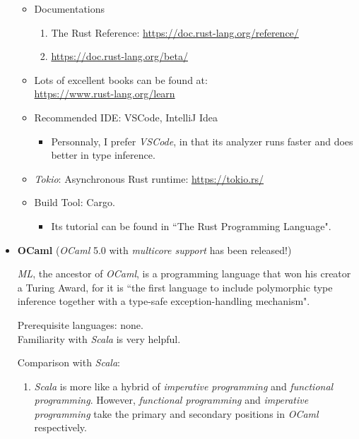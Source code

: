 \documentclass{article}
\begin{document}
\begin{itemize}
\begin{itemize}
\begin{enumerate}
        \end{enumerate}
        \item Documentations
        \begin{enumerate}
            \item The Rust Reference:
            \href{https://doc.rust-lang.org/reference/}{https://doc.rust-lang.org/reference/}
            \item \href{https://doc.rust-lang.org/beta/}{https://doc.rust-lang.org/beta/}
        \end{enumerate}
        \item Lots of excellent books can be found at:\\
        \href{https://www.rust-lang.org/learn}{https://www.rust-lang.org/learn}
        \item Recommended IDE: VSCode, IntelliJ Idea
        \begin{itemize}
            \item Personnaly, I prefer \emph{VSCode}, in that its analyzer runs faster and does better in type inference.
        \end{itemize}
        \item \emph{Tokio}: Asynchronous Rust runtime:
        \href{https://tokio.rs/}{https://tokio.rs/}
        \item Build Tool: Cargo.
        \begin{itemize}
            \item Its tutorial can be found in ``The Rust Programming Language".
        \end{itemize}
    \end{itemize}

    \item \textbf{OCaml} (\emph{OCaml} 5.0 with \emph{multicore support} has been released!)
    
    \emph{ML}, the ancestor of \emph{OCaml}, is a programming language that won his creator a Turing Award, for it is ``the first language to include polymorphic type inference together with a type-safe exception-handling mechanism".
    
    Prerequisite languages: none.\\
    Familiarity with \emph{Scala} is very helpful.
    
    Comparison with \emph{Scala}:
    \begin{enumerate}
        \item \emph{Scala} is more like a hybrid of \emph{imperative programming} and \emph{functional programming}.
        However, \emph{functional programming} and \emph{imperative programming} take the primary and secondary positions in \emph{OCaml} respectively.
        

\end{enumerate}
\end{itemize}
\end{document}

